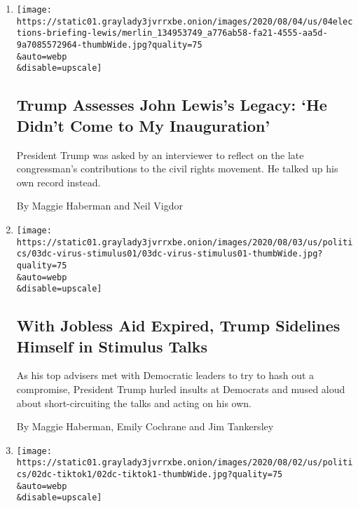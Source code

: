\begin{enumerate}
\def\labelenumi{\arabic{enumi}.}
\item
  \href{/2020/08/04/us/politics/trump-john-lewis-axios.html}{}

  \texttt{[image: https://static01.graylady3jvrrxbe.onion/images/2020/08/04/us/04elections-briefing-lewis/merlin\_134953749\_a776ab58-fa21-4555-aa5d-9a7085572964-thumbWide.jpg?quality=75\\\&auto=webp\\\&disable=upscale]}

  \hypertarget{trump-assesses-john-lewiss-legacy-he-didnt-come-to-my-inauguration}{%
  \subsection{Trump Assesses John Lewis's Legacy: `He Didn't Come to My
  Inauguration'}\label{trump-assesses-john-lewiss-legacy-he-didnt-come-to-my-inauguration}}

  President Trump was asked by an interviewer to reflect on the late
  congressman's contributions to the civil rights movement. He talked up
  his own record instead.

  By Maggie Haberman and Neil Vigdor
\item
  \href{/2020/08/03/us/politics/congress-jobless-aid-talks-trump.html}{}

  \texttt{[image: https://static01.graylady3jvrrxbe.onion/images/2020/08/03/us/politics/03dc-virus-stimulus01/03dc-virus-stimulus01-thumbWide.jpg?quality=75\\\&auto=webp\\\&disable=upscale]}

  \hypertarget{with-jobless-aid-expired-trump-sidelines-himself-in-stimulus-talks}{%
  \subsection{With Jobless Aid Expired, Trump Sidelines Himself in
  Stimulus
  Talks}\label{with-jobless-aid-expired-trump-sidelines-himself-in-stimulus-talks}}

  As his top advisers met with Democratic leaders to try to hash out a
  compromise, President Trump hurled insults at Democrats and mused
  aloud about short-circuiting the talks and acting on his own.

  By Maggie Haberman, Emily Cochrane and Jim Tankersley
\item
  \href{/2020/08/02/business/economy/trump-tiktok-china-national-security.html}{}

  \texttt{[image: https://static01.graylady3jvrrxbe.onion/images/2020/08/02/us/politics/02dc-tiktok1/02dc-tiktok1-thumbWide.jpg?quality=75\\\&auto=webp\\\&disable=upscale]}


\end{enumerate}
